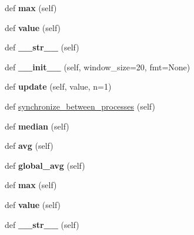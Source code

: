 \begin{DoxyCompactItemize}
\mbox{\label{classutils_1_1SmoothedValue_a158b58316c2fce950e45973acd514523}} 
def {\bfseries max} (self)
\item 
\mbox{\label{classutils_1_1SmoothedValue_a102baf7191d54900fc448004a41f4da5}} 
def {\bfseries value} (self)
\item 
\mbox{\label{classutils_1_1SmoothedValue_ad4cc419248d1d78c567600ecf8236e6a}} 
def {\bfseries \+\_\+\+\_\+str\+\_\+\+\_\+} (self)
\item 
\mbox{\label{classutils_1_1SmoothedValue_ae3f395e1967e26ff15efbdd5149dc1ee}} 
def {\bfseries \+\_\+\+\_\+init\+\_\+\+\_\+} (self, window\+\_\+size=20, fmt=None)
\item 
\mbox{\label{classutils_1_1SmoothedValue_ad907a5758d104cef55dbc7056f29d6e4}} 
def {\bfseries update} (self, value, n=1)
\item 
def \hyperlink{classutils_1_1SmoothedValue_a8d10c867abf46adb6b0be5b6adcf1236}{synchronize\+\_\+between\+\_\+processes} (self)
\item 
\mbox{\label{classutils_1_1SmoothedValue_ab3e14bcdb1429898324595abbf30ec07}} 
def {\bfseries median} (self)
\item 
\mbox{\label{classutils_1_1SmoothedValue_a17cc6f86030d87fe010925409bc1ed2a}} 
def {\bfseries avg} (self)
\item 
\mbox{\label{classutils_1_1SmoothedValue_a36a8e70157cd8708141835f19b5d972d}} 
def {\bfseries global\+\_\+avg} (self)
\item 
\mbox{\label{classutils_1_1SmoothedValue_a158b58316c2fce950e45973acd514523}} 
def {\bfseries max} (self)
\item 
\mbox{\label{classutils_1_1SmoothedValue_a102baf7191d54900fc448004a41f4da5}} 
def {\bfseries value} (self)
\item 
\mbox{\label{classutils_1_1SmoothedValue_ad4cc419248d1d78c567600ecf8236e6a}} 
def {\bfseries \+\_\+\+\_\+str\+\_\+\+\_\+} (self)
\end{DoxyCompactItemize}
